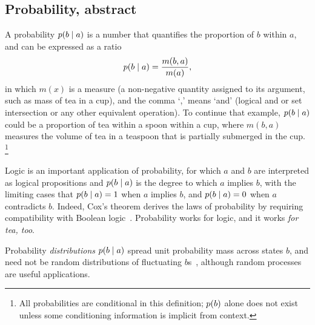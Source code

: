 \subsection{Probability, abstract}
A probability $p(b \mid a)$ is a number that quantifies the proportion
of $b$ within $a$, and can be expressed as a ratio~\cite{axioms1010038}
\begin{equation}
\label{eqn:searches_prob_ratio}
p(b \mid a) = \frac{m(b, a)}{m(a)},
\end{equation}
in which $m(x)$ is a measure (a non-negative quantity assigned to its
argument, such as mass of tea in a cup), and the comma `,' means `and'
(logical and or set intersection or any other equivalent operation).
To continue that example, $p(b \mid a)$ could be a proportion of tea within
a spoon within a cup, where $m(b, a)$ measures the volume of tea in a
teaspoon that is partially submerged in the cup.%
\footnote{%
All probabilities are conditional in this definition; $p(b)$ alone does
not exist unless some conditioning information is implicit from context.%
}

Logic is an important application of probability, for which $a$ and $b$ are
interpreted as logical propositions and
$p(b \mid a)$ is the degree to which $a$ implies $b$, with the limiting cases
that $p(b \mid a) = 1$ when $a$ implies $b$, and $p(b \mid a) = 0$ when $a$
contradicts $b$.
Indeed, Cox's theorem derives the laws of probability by requiring compatibility
with Boolean logic~\cite{
cox1946probability,
cox1961algebra,
garrett1998nand,
jaynes2003probability,
keynes1920treatise
}.
Probability works for logic, and it works \emph{for tea, too}.

Probability \emph{distributions} $p(b \mid a)$ spread unit probability mass
across states $b$, and need not be random distributions of fluctuating
$b$s~\cite{jaynes2003probability,frankfurt2005on}, although random processes
are useful applications.

